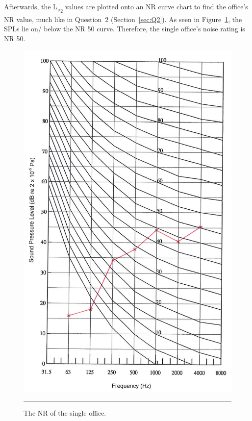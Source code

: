 Afterwards, the L\textsubscript{p\textsubscript{2}} values are plotted onto an NR curve chart to find the office's NR value, much like in Question~2 (Section~\ref{sec:Q2}).
As seen in Figure~\ref{fig:NR_office}, the SPLs lie on/ below the NR 50 curve.
Therefore, the single office's noise rating is NR 50.

\begin{figure}[htbp]
	\centering
	\includegraphics[height=.6\textheight]{figures/NR_office.jpg}
	\rule{.6\textwidth}{0.5pt} %
	\caption{The NR of the single office.}
	\label{fig:NR_office}
\end{figure}

